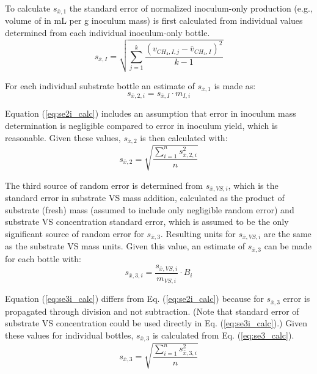 \documentclass[]{article}
\begin{document}
To calculate $s_{\bar{x},1}$ the standard error of normalized inoculum-only  production (e.g., volume of  in mL per g inoculum mass) is first calculated from individual values determined from each individual inoculum-only bottle. 
\begin{equation}
  \label{eq:seI_calc}
  s_{\bar{x},I} = \sqrt{\sum_{j=1} ^k \frac{(v_{CH_4, I, j} - \bar{v}_{CH_4, I})^2} {k -1} }
\end{equation}

For each individual substrate bottle an estimate of $s_{\bar{x},1}$ is made as:
\begin{equation}
  \label{eq:se2i_calc}
  s_{\bar{x},2,i} = s_{\bar{x},I} \cdot m_{I, i} 
\end{equation}

Equation (\ref{eq:se2i_calc}) includes an assumption that error in inoculum mass determination is negligible compared to error in inoculum  yield, which is reasonable. 
Given these values, $s_{\bar{x},2}$ is then calculated with:
\begin{equation}
  \label{eq:se2_calc}
  s_{\bar{x},2} = \sqrt{\frac{\sum_{i=1} ^n s_{\bar{x},2,i}^2} {n}}
\end{equation}

The third source of random error is determined from $s_{\bar{x},VS,i}$, which is the standard error in substrate VS mass addition, calculated as the product of substrate (fresh) mass (assumed to include only negligible random error) and substrate VS concentration standard error, which is assumed to be the only significant source of random error for $s_{\bar{x},3}$. 
Resulting units for $s_{\bar{x},VS,i}$ are the same as the substrate VS mass units. 
Given this value, an estimate of $s_{\bar{x},3}$ can be made for each bottle with:
\begin{equation}
  \label{eq:se3i_calc}
  s_{\bar{x},3,i} = \frac{s_{\bar{x},VS,i}} {m_{VS,i}} \cdot B_{i}
\end{equation}

Equation (\ref{eq:se3i_calc}) differs from Eq. (\ref{eq:se2i_calc}) because for $s_{\bar{x},3}$ error is propagated through division and not subtraction. 
(Note that standard error of substrate VS concentration could be used directly in Eq. (\ref{eq:se3i_calc}).) 
Given these values for individual bottles, $s_{\bar{x},3}$ is calculated from Eq. (\ref{eq:se3_calc}).
\begin{equation}
  \label{eq:se3_calc}
  s_{\bar{x},3} = \sqrt{\frac{\sum_{i=1} ^n s_{\bar{x},3,i}^2} {n}}
\end{equation}
\end{document}
